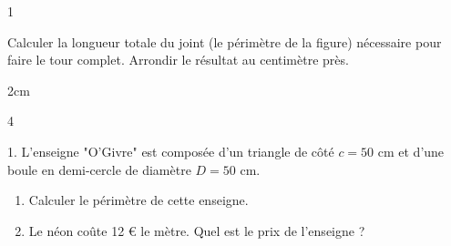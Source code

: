 \documentclass[a4paper]{book}
\begin{document}
{\begin{exerciceNote}{1}
\begin{minipage}{0.6\linewidth}
            Calculer la longueur totale du joint (le périmètre de la figure) nécessaire pour faire le tour complet. Arrondir le résultat au centimètre près.

            \begin{ZoneReponse}{2cm}
            \end{ZoneReponse}
        \end{minipage}
        \hfill
        \begin{minipage}{0.35\linewidth}
            \begin{center}
            \end{center}
        \end{minipage}
    \end{exerciceNote}


    \begin{exerciceNote}{4}
        \begin{minipage}{0.8\linewidth}
            1. L'enseigne "O'Givre" est composée d'un triangle de côté $c = 50$ cm et d'une boule en demi-cercle de diamètre $D = 50$ cm.
            \begin{enumerate}[leftmargin=*, label=\alph*.]
                \item Calculer le périmètre de cette enseigne.
                \item Le néon coûte 12 € le mètre. Quel est le prix de l'enseigne ?
            \end{enumerate}


\end{minipage}
\end{exerciceNote}}
\end{document}
